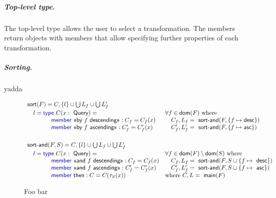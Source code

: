 \documentclass[a4paper,UKenglish]{lipics-v2016}
\newcommand{\kvd}[1]{\textnormal{\textcolor{kvdclr}{\sffamily #1}}}
\newcommand{\ident}[1]{\textnormal{\sffamily #1}}
\newcommand{\qident}[1]{\textnormal{\sffamily \guillemotleft #1\guillemotright}}
\newcommand{\dom}{\ident{dom}}
\begin{document}
\subparagraph{Top-level type.} The top-level type allows the user to select a transformation. The
members return objects with members that allow specifying further properties of each transformation.




\subparagraph{Sorting.} yadda

\begin{figure}
\begin{equation*}
\begin{array}{ll}
\ident{sort}(F) = C, \{l\} \cup \bigcup L_f \cup \bigcup L'_f\\[0.25em]
\quad l = \kvd{type}~C(x:\ident{Query}) = &\forall f\in\dom(F)~\textnormal{where} \\
\qquad \qquad \kvd{member}~\qident{by $f$ descending} : C_f = C_f(x) &\quad C_f, L_f = \ident{sort-and}(F, \{ f \mapsto \ident{desc} \})\\
\qquad \qquad \kvd{member}~\qident{by $f$ ascending} : C'_f = C'_f(x) &\quad C'_f, L'_f = \ident{sort-and}(F, \{ f \mapsto \ident{asc} \})\\
\\[0.5em]
\ident{sort-and}(F,S) = C, \{l\} \cup \bigcup L_f \cup \bigcup L'_f\\[0.25em]
\quad l = \kvd{type}~C(x:\ident{Query}) = &\forall f\in\dom(F)\setminus\dom(S)~\textnormal{where} \\
\qquad \qquad \kvd{member}~\qident{and $f$ descending} : C_f = C_f(x) &\quad C_f, L_f = \ident{sort-and}(F, S\cup\{ f \mapsto \ident{desc} \})\\
\qquad \qquad \kvd{member}~\qident{and $f$ ascending} : C'_f = C'_f(x) &\quad C'_f, L'_f = \ident{sort-and}(F, S\cup\{ f \mapsto \ident{asc} \})\\
\qquad \qquad \kvd{member}~\ident{then} : C = C(\tau_S(x))                 &\textnormal{where}~C, L = \ident{main}(F)\\
\end{array}
\end{equation*}
\caption{Foo bar}
\label{fig:foobar}
\end{figure}
\end{document}
